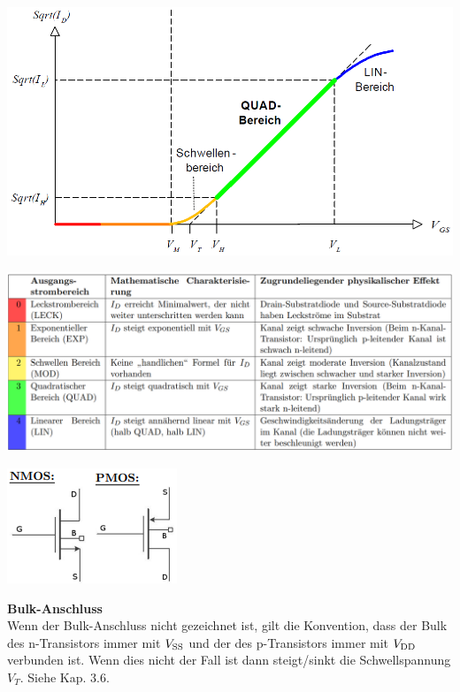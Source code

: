 \begin{minipage}{0.33\linewidth}
\includegraphics[width=1\linewidth]{Transferkennline_Sqrt.png}
\end{minipage}\newpage
\begin{minipage}{0.8\linewidth}
\includegraphics[width=1\linewidth]{Ausgangsstrombereiech.png}
\end{minipage}%
\begin{minipage}{0.2\linewidth}
\includegraphics[angle=90, width=0.8\linewidth]{Selbstsperrend MOS-Transistor.png}
\end{minipage}
\textbf{Bulk-Anschluss}\\
Wenn der Bulk-Anschluss nicht gezeichnet ist, gilt die Konvention, dass der Bulk des n-Transistors immer mit $V_{\rm SS}$ und der des p-Transistors immer mit $V_{\rm DD}$ verbunden ist. Wenn dies nicht der Fall ist dann steigt/sinkt die Schwellspannung $V_T$. Siehe Kap. 3.6.
